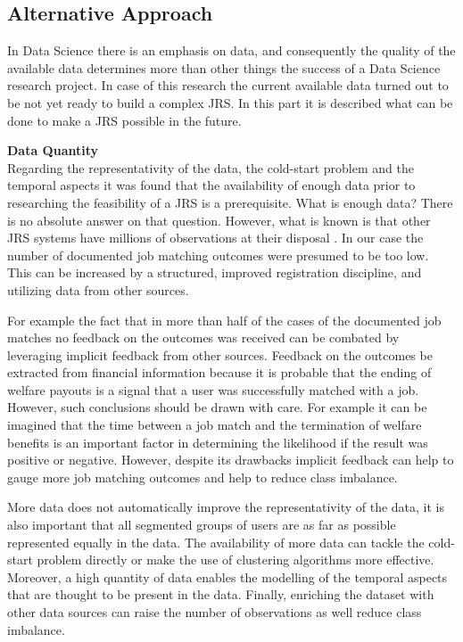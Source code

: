 \subsection{Alternative Approach}
\label{ssec:learnings}

In Data Science there is an emphasis on data, and consequently the quality of the available data determines more than other things the success of a Data Science research project.
In case of this research the current available data turned out to be not yet ready to build a complex JRS. 
In this part it is described what can be done to make a JRS possible in the future.

\noindent
\textbf{Data Quantity}\\
Regarding the representativity of the data, the cold-start problem and the temporal aspects it was found that the availability of enough data prior to researching the feasibility of a JRS is a prerequisite.
What is enough data?
There is no absolute answer on that question. 
However, what is known is that other JRS systems have millions of observations at their disposal \cite{kenthapadi2017personalized, T.Al-Otaibi2012ASystems, Zheng2012JobSurvey, hong2013job}.
In our case the number of documented job matching outcomes were presumed to be too low. 
This can be increased by a structured, improved registration discipline, and utilizing data from other sources.

For example the fact that in more than half of the cases of the documented job matches no feedback on the outcomes was received can be combated by leveraging implicit feedback from other sources.
Feedback on the outcomes be extracted from financial information because it is probable that the ending of welfare payouts is a signal that a user was successfully matched with a job. 
However, such conclusions should be drawn with care.
For example it can be imagined that the time between a job match and the termination of welfare benefits is an important factor in determining the likelihood if the result was positive or negative. 
However, despite its drawbacks implicit feedback can help to gauge more job matching outcomes and help to reduce class imbalance.

More data does not automatically improve the representativity of the data, it is also important that all segmented groups of users are as far as possible represented equally in the data.
The availability of more data can tackle the cold-start problem directly or make the use of clustering algorithms more effective. 
Moreover, a high quantity of data enables the modelling of the temporal aspects that are thought to be present in the data.
Finally, enriching the dataset with other data sources can raise the number of observations as well reduce class imbalance.


